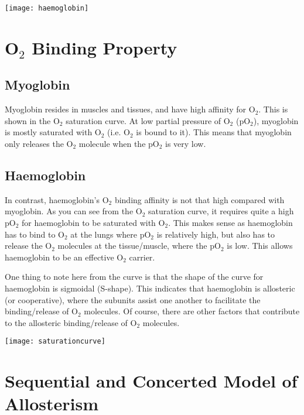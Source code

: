 \begin{center}
\texttt{[image: haemoglobin]}
\end{center}

\section{O$_2$ Binding Property}

\subsection{Myoglobin}

Myoglobin resides in muscles and tissues, and have high affinity for O$_2$.
This is shown in the O$_2$ saturation curve.
At low partial pressure of O$_2$ (pO$_2$), myoglobin is mostly saturated with O$_2$ (i.e. O$_2$ is bound to it).
This means that myoglobin only releases the O$_2$ molecule when the pO$_2$ is very low.

\subsection{Haemoglobin}

In contrast, haemoglobin's O$_2$ binding affinity is not that high compared with myoglobin.
As you can see from the O$_2$ saturation curve, it requires quite a high pO$_2$ for haemoglobin to be saturated with O$_2$.
This makes sense as haemoglobin has to bind to O$_2$ at the lungs where pO$_2$ is relatively high, but also has to release the O$_2$ molecules at the tissue/muscle, where the pO$_2$ is low.
This allows haemoglobin to be an effective O$_2$ carrier.

One thing to note here from the curve is that the shape of the curve for haemoglobin is sigmoidal (S-shape).
This indicates that haemoglobin is allosteric (or cooperative), where the subunits assist one another to facilitate the binding/release of O$_2$ molecules.
Of course, there are other factors that contribute to the allosteric binding/release of O$_2$ molecules.

\begin{center}
\texttt{[image: saturationcurve]}
\end{center}

\section{Sequential and Concerted Model of \-Allosterism}

